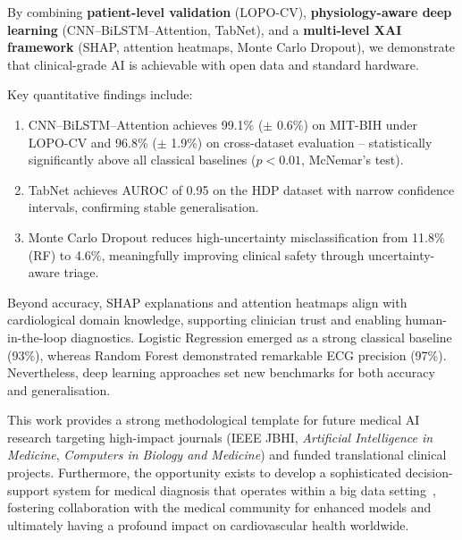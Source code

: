 \documentclass[10pt, twocolumn]{article}
\begin{document}
By combining \textbf{patient-level validation} (LOPO-CV), \textbf{physiology-aware deep
learning} (CNN--BiLSTM--Attention, TabNet), and a \textbf{multi-level XAI framework}
(SHAP, attention heatmaps, Monte Carlo Dropout), we demonstrate that clinical-grade AI
is achievable with open data and standard hardware.

Key quantitative findings include:
\begin{enumerate}[leftmargin=*, label=(\arabic*)]
  \item CNN--BiLSTM--Attention achieves 99.1\% ($\pm$ 0.6\%) on MIT-BIH under LOPO-CV
        and 96.8\% ($\pm$ 1.9\%) on cross-dataset evaluation -- statistically significantly
        above all classical baselines ($p < 0.01$, McNemar's test).
  \item TabNet achieves AUROC of 0.95 on the HDP dataset with narrow confidence intervals,
        confirming stable generalisation.
  \item Monte Carlo Dropout reduces high-uncertainty misclassification from 11.8\% (RF) to
        4.6\%, meaningfully improving clinical safety through uncertainty-aware triage.
\end{enumerate}

Beyond accuracy, SHAP explanations and attention heatmaps align with cardiological domain
knowledge, supporting clinician trust and enabling human-in-the-loop diagnostics.
Logistic Regression emerged as a strong classical baseline (93\%), whereas Random Forest
demonstrated remarkable ECG precision (97\%).
Nevertheless, deep learning approaches set new benchmarks for both accuracy and
generalisation.

This work provides a strong methodological template for future medical AI research targeting
high-impact journals (IEEE JBHI, \textit{Artificial Intelligence in Medicine},
\textit{Computers in Biology and Medicine}) and funded translational clinical projects.
Furthermore, the opportunity exists to develop a sophisticated decision-support system for
medical diagnosis that operates within a big data setting~\cite{tourad2018,outfarouin2016},
fostering collaboration with the medical community for enhanced models and ultimately having
a profound impact on cardiovascular health worldwide.
\end{document}
